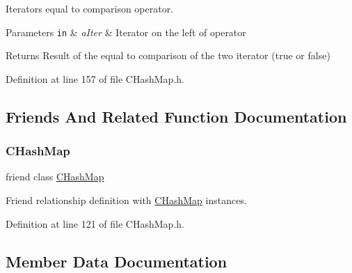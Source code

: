 Iterators equal to comparison operator. 


\begin{DoxyParams}[1]{Parameters}
\mbox{\tt in}  & {\em a\+Iter} & Iterator on the left of operator \\
\hline
\end{DoxyParams}
\begin{DoxyReturn}{Returns}
Result of the equal to comparison of the two iterator ({\ttfamily true} or {\ttfamily false}) 
\end{DoxyReturn}


Definition at line 157 of file C\+Hash\+Map.\+h.



\subsection{Friends And Related Function Documentation}
\mbox{\label{class_c_hash_map_1_1_c_forward_iterator_ae4f62cde73f2b1bf2c70f84caece63e5}} 
\subsubsection{\texorpdfstring{C\+Hash\+Map}{CHashMap}}
{\footnotesize\ttfamily friend class \hyperlink{class_c_hash_map}{C\+Hash\+Map}\hspace{0.3cm}{\ttfamily [friend]}}



Friend relationship definition with \hyperlink{class_c_hash_map}{C\+Hash\+Map} instances. 



Definition at line 121 of file C\+Hash\+Map.\+h.



\subsection{Member Data Documentation}
\mbox{\label{class_c_hash_map_1_1_c_forward_iterator_a2d35146f69fc7b1b3edd849ee36f5a69}} 
